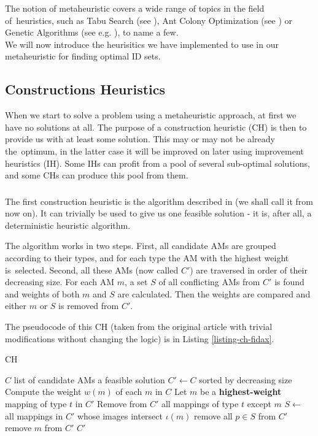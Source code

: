 The notion of metaheuristic covers a wide range of topics in the field of~heuristics, such as Tabu Search (see \cite{Glover:1997:TS:549765}), Ant Colony Optimization (see \cite{dorigo2004ant}) or Genetic Algorithms (see e.g. \cite{goldberg1989genetic}), to name a few.\\

We will now introduce the heurisitics we have implemented to use in our metaheuristic for finding optimal ID sets.

\subsection{Constructions Heuristics}
\label{section-mip-chs}

When we start to solve a problem using a metaheuristic approach, at first we have no solutions at all. The purpose of a construction heuristic (CH) is then to provide us with at least some solution. This may or may not be already the~optimum, in the latter case it will be improved on later using improvement heuristics (IH). Some IHs can profit from a pool of several sub-optimal solutions, and some CHs can produce this pool from them.

\subsubsection{}
\label{section-mip-fidax}

The first construction heuristic is the algorithm described in \cite{fidax} (we shall call it  from now on). It can trivially be used to give us one feasible solution - it is, after all, a deterministic heuristic algorithm.

The algorithm works in two steps. First, all candidate AMs are grouped according to their types, and for each type the AM with the highest weight is~selected. Second, all these AMs (now called $C'$) are traversed in order of their decreasing size. For each AM $m$, a set $S$ of all conflicting AMs from $C'$ is found and weights of both $m$ and $S$ are calculated. Then the weights are compared and either $m$ or $S$ is removed from $C'$.

The pseudocode of this CH (taken from the original article with trivial modifications without changing the logic) is in Listing \ref{listing-ch-fidax}.

\begin{algorithm}
\caption{ CH}
\label{listing-ch-fidax}
\begin{algorithmic}
\REQUIRE $C$ list of candidate AMs
\ENSURE a feasible solution
\STATE $C' \gets C$ sorted by decreasing size
\STATE Compute the weight $w(m)$ of each $m$ in $C$
  \STATE Let $m$ be a \textbf{highest-weight} mapping of type $t$ in $C'$
  \STATE Remove from $C'$ all mappings of type $t$ except $m$
\ENDFOR
{}
  \STATE $S \gets$ all mappings in $C'$ whose images intersect $\iota(m)$
    \STATE remove all $p \in S$ from $C'$
  \ELSE
    \STATE remove $m$ from $C'$
  \ENDIF
\ENDFOR
\RETURN $C'$
\end{algorithmic}
\end{algorithm}


